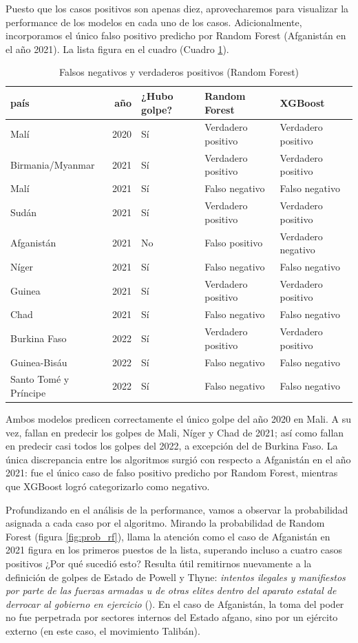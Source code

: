 \documentclass{article}
\begin{document}
Puesto que los casos positivos son apenas diez, aprovecharemos para visualizar la performance
de los modelos en cada uno de los casos. Adicionalmente, incorporamos el único falso positivo
predicho por Random Forest (Afganistán en el año 2021). La lista figura en el cuadro 
(Cuadro \ref{tab:resultados}).

\begin{table}[H]
  \centering
    \begin{tabular}{lrlll}
      \toprule
      país & año & ¿Hubo golpe? & Random Forest & XGBoost \\
      \midrule
      Malí & 2020 & Sí & Verdadero positivo & Verdadero positivo \\
      Birmania/Myanmar & 2021 & Sí & Verdadero positivo & Verdadero positivo \\
      Malí & 2021 & Sí & Falso negativo & Falso negativo \\
      Sudán & 2021 & Sí & Verdadero positivo & Verdadero positivo \\
      Afganistán & 2021 & No & Falso positivo & Verdadero negativo \\
      Níger & 2021 & Sí & Falso negativo & Falso negativo \\
      Guinea & 2021 & Sí & Verdadero positivo & Verdadero positivo \\
      Chad & 2021 & Sí & Falso negativo & Falso negativo \\
      Burkina Faso & 2022 & Sí & Verdadero positivo & Verdadero positivo \\
      Guinea-Bisáu & 2022 & Sí & Falso negativo & Falso negativo \\
      Santo Tomé y Príncipe & 2022 & Sí & Falso negativo & Falso negativo \\
      \bottomrule
    \end{tabular}
  \caption{Falsos negativos y verdaderos positivos (Random Forest) \label{tab:resultados}}
\end{table}

Ambos modelos predicen correctamente el único golpe del año 2020 en Mali. A su
vez, fallan en predecir los golpes de Mali, Níger y Chad de 2021; así como fallan en predecir
casi todos los golpes del 2022, a excepción del de Burkina Faso. La única discrepancia entre
los algoritmos surgió con respecto a Afganistán en el año 2021: fue el único caso de falso
positivo predicho por Random Forest, mientras que XGBoost logró categorizarlo como negativo.

Profundizando en el análisis de la performance, vamos a observar la probabilidad asignada
a cada caso por el algoritmo. Mirando la probabilidad de Random Forest 
(figura \ref{fig:prob_rf}), llama la atención como el caso de Afganistán en 2021 figura
en los primeros puestos de la lista, superando incluso a cuatro casos positivos ¿Por qué sucedió esto?
Resulta útil remitirnos nuevamente a la definición de golpes de Estado de Powell y Thyne:
\textit{intentos ilegales y manifiestos por parte de las fuerzas armadas u de otras elites dentro
del aparato estatal de derrocar al gobierno en ejercicio} (\cite[p.~252]{Pow11}). En el caso de 
Afganistán, la toma del poder no fue perpetrada por sectores internos del Estado afgano, sino
por un ejército externo (en este caso, el movimiento Talibán).
\end{document}
